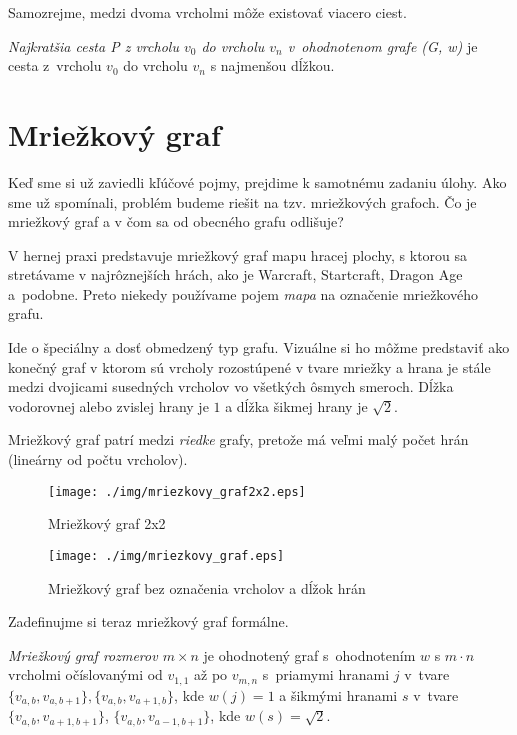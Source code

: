 Samozrejme, medzi dvoma vrcholmi môže existovať viacero ciest.

\begin{define}
{\sl Najkratšia cesta P z vrcholu $v_0$ do vrcholu $v_n$
v~ohodnotenom grafe (G, w)} 
je cesta z~vrcholu $v_0$ do vrcholu $v_n$ s najmenšou dĺžkou. 
\end{define}


\section{Mriežkový graf}

Keď sme si už zaviedli kľúčové pojmy, prejdime k samotnému
zadaniu úlohy.
Ako sme už spomínali, problém budeme riešit na tzv. mriežkových grafoch. Čo je mriežkový graf a v čom sa od obecného grafu odlišuje?

V hernej praxi predstavuje mriežkový graf mapu hracej plochy, s ktorou sa stretávame v najrôznejších hrách, ako je Warcraft, Startcraft, Dragon Age \cite{sturtevant2012benchmarks}
a~podobne. Preto niekedy používame pojem \emph{mapa} na označenie mriežkového grafu.

Ide o špeciálny a dosť obmedzený typ grafu. Vizuálne si ho môžme predstaviť ako konečný graf v ktorom sú vrcholy rozostúpené v tvare mriežky a hrana
je stále medzi dvojicami susedných vrcholov vo všetkých ôsmych smeroch. Dĺžka vodorovnej alebo zvislej hrany je $1$ a dĺžka šikmej hrany je $\sqrt{2}$.

\begin{note}
Mriežkový graf patrí medzi {\sl riedke} grafy,
pretože má veľmi malý počet hrán (lineárny od počtu vrcholov).
\end{note}


\begin{figure}[h]
\centering
\texttt{[image: ./img/mriezkovy\_graf2x2.eps]}
\caption{Mriežkový graf 2x2}
\label{fig:mriezkovy_graf2x2}
\end{figure}


\begin{figure}[h]
\centering
\texttt{[image: ./img/mriezkovy\_graf.eps]}
\caption{Mriežkový graf bez označenia vrcholov a dĺžok hrán}
\label{fig:mriezkovy_graf}
\end{figure}


Zadefinujme si teraz mriežkový graf formálne.

\begin{define}
{\sl Mriežkový graf rozmerov $m \times n$} je ohodnotený graf s~ohodnotením $w$ s $m \cdot n$ vrcholmi očíslovanými od $v_{1,1}$ až po $v_{m,n}$ 
s~priamymi hranami $j$ v~tvare $\{v_{a,b}, v_{a,b+1}\}, \{v_{a,b}, v_{a+1,b}\}$, kde $w(j) = 1$ 
a šikmými hranami $ s $ v~tvare 
$\{v_{a,b}, v_{a+1,b+1}\}$, $\{v_{a,b}, v_{a-1,b+1}\}$, kde $ w(s) = \sqrt{2}$.
\end{define}

